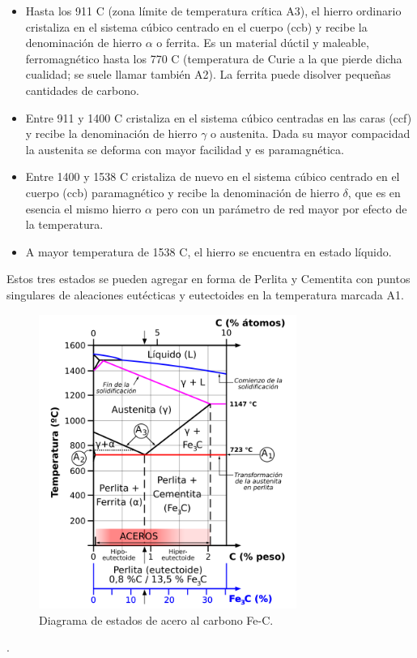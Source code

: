 \begin{itemize}
	\item Hasta los 911 \textdegree C (zona límite de temperatura crítica A3), el hierro ordinario cristaliza en el sistema cúbico centrado en el cuerpo (ccb) y recibe la denominación de hierro $\alpha$ o ferrita. Es un material dúctil y maleable, ferromagnético hasta los 770 \textdegree C (temperatura de Curie a la que pierde dicha cualidad; se suele llamar también A2). La ferrita puede disolver pequeñas cantidades de carbono.
	
	\item Entre 911 y 1400 \textdegree C cristaliza en el sistema cúbico centradas en las caras (ccf) y recibe la denominación de hierro $\gamma$ o austenita. Dada su mayor compacidad la austenita se deforma con mayor facilidad y es paramagnética.
	
	\item Entre 1400 y 1538 \textdegree C cristaliza de nuevo en el sistema cúbico centrado en el cuerpo (ccb) paramagnético y recibe la denominación de hierro $\delta$, que es en esencia el mismo hierro $\alpha$ pero con un parámetro de red mayor por efecto de la temperatura.

	\item A mayor temperatura de 1538 \textdegree C, el hierro se encuentra en estado líquido.
\end{itemize}

Estos tres estados se pueden agregar en forma de Perlita y Cementita con puntos singulares de aleaciones eutécticas y eutectoides en la temperatura marcada A1.

\begin{figure}[h]
	\centering
	\includegraphics[width=0.75\textwidth]{./Figures/800px-Diagrama_Fe_C_zona_de_los_aceros.png}
	\caption{Diagrama de estados de acero al carbono Fe-C\protect\footnotemark.}
	\label{fig:DiagramaFeC}
\end{figure}.

